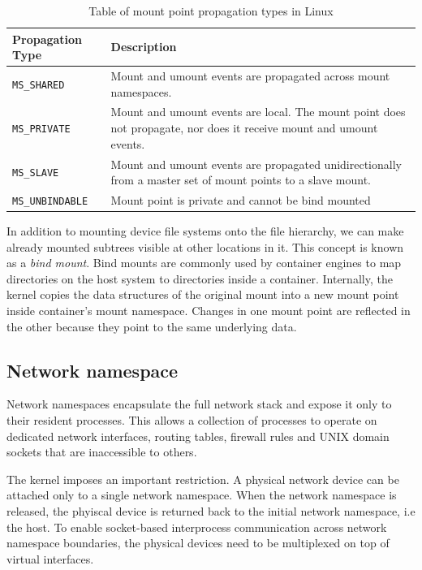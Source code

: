 \begin{table}[h!]
    \centering
    \begin{tabular}{ |m{4cm}|m{20em}| }
        \hline
        Propagation Type & Description \\
        \hline
        \verb|MS_SHARED| & Mount and umount events are propagated across mount namespaces. \\
        \hline 
        \verb|MS_PRIVATE| & Mount and umount events are local. The mount point does not propagate, nor does it receive mount and umount events. \\
        \hline
        \verb|MS_SLAVE| & Mount and umount events are propagated unidirectionally from a master set of mount points to a slave mount. \\
        \hline
        \verb|MS_UNBINDABLE| & Mount point is private and cannot be bind mounted \\
        \hline
    \end{tabular}
    \caption{Table of mount point propagation types in Linux}
    \label{table:fundamentals/namespaces/mount/propagation-types}
\end{table}

In addition to mounting device file systems onto the file hierarchy, we can make 
already mounted subtrees visible at other locations in it. This concept is known as a 
\textit{bind mount}. Bind mounts are commonly used by container engines to map directories 
on the host system to directories inside a container. Internally, the kernel copies
the data structures of the original mount into a new mount point inside 
container's mount namespace. Changes in one mount point are reflected in the other 
because they point to the same underlying data. 

\subsection{Network namespace}
\label{sections:fundamentals/namespaces/network}
Network namespaces encapsulate the full network stack and expose it only to 
their resident processes. This allows a collection of processes to operate on 
dedicated network interfaces, routing tables, firewall rules and UNIX domain sockets 
that are inaccessible to others. 

The kernel imposes an important restriction. A physical network device can be attached only 
to a single network namespace. When the network namespace is released, the phyiscal device 
is returned back to the initial network namespace, i.e the host. To enable socket-based interprocess
communication across network namespace boundaries, 
the physical devices need to be multiplexed on top of virtual interfaces. 

